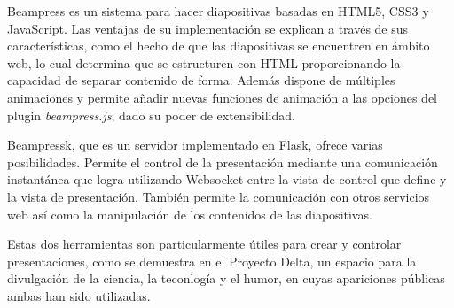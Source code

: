 \begin{conclusions}

	Beampress es un sistema para hacer diapositivas basadas en HTML5, CSS3 y JavaScript. Las ventajas de su implementación se explican a través de sus características, como el hecho de que las diapositivas se encuentren en ámbito web, lo cual determina que se estructuren con HTML proporcionando la capacidad de separar contenido de forma. Además dispone de múltiples animaciones y permite añadir nuevas funciones de animación a las opciones del plugin \textit{beampress.js}, dado su poder de extensibilidad.

	Beampressk, que es un servidor implementado en Flask, ofrece varias posibilidades. Permite el control de la presentación mediante una comunicación instantánea que logra utilizando Websocket entre la vista de control que define y la vista de presentación. También permite la comunicación con otros servicios web así como la manipulación de los contenidos de las diapositivas.

	Estas dos herramientas son particularmente útiles para crear y controlar presentaciones, como se demuestra en el Proyecto Delta, un espacio para la divulgación de la ciencia, la teconlogía y el humor, en cuyas apariciones públicas ambas han sido utilizadas. 

\end{conclusions}
